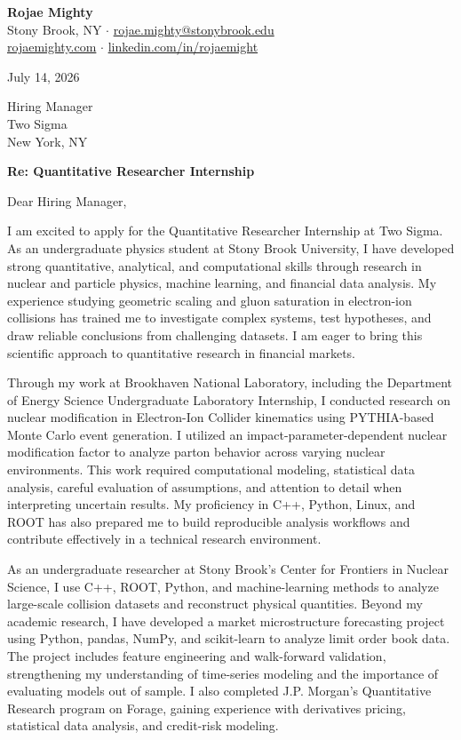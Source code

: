 \documentclass[10pt,letterpaper]{article}
\begin{document}
\textbf{Rojae Mighty}\\
Stony Brook, NY \quad$\cdot$\quad
\href{mailto:rojae.mighty@stonybrook.edu}{rojae.mighty@stonybrook.edu}\\
\href{https://rojaemighty.com}{rojaemighty.com} \quad$\cdot$\quad
\href{https://www.linkedin.com/in/rojaemight/}{linkedin.com/in/rojaemight}

\vspace{8pt}
July 14, 2026

\vspace{8pt}
Hiring Manager\\
Two Sigma\\
New York, NY

\vspace{8pt}
\textbf{Re: Quantitative Researcher Internship}

\vspace{4pt}
Dear Hiring Manager,

I am excited to apply for the Quantitative Researcher Internship at Two Sigma. As an undergraduate physics student at Stony Brook University, I have developed strong quantitative, analytical, and computational skills through research in nuclear and particle physics, machine learning, and financial data analysis. My experience studying geometric scaling and gluon saturation in electron-ion collisions has trained me to investigate complex systems, test hypotheses, and draw reliable conclusions from challenging datasets. I am eager to bring this scientific approach to quantitative research in financial markets.

Through my work at Brookhaven National Laboratory, including the Department of Energy Science Undergraduate Laboratory Internship, I conducted research on nuclear modification in Electron-Ion Collider kinematics using PYTHIA-based Monte Carlo event generation. I utilized an impact-parameter-dependent nuclear modification factor to analyze parton behavior across varying nuclear environments. This work required computational modeling, statistical data analysis, careful evaluation of assumptions, and attention to detail when interpreting uncertain results. My proficiency in C++, Python, Linux, and ROOT has also prepared me to build reproducible analysis workflows and contribute effectively in a technical research environment.

As an undergraduate researcher at Stony Brook's Center for Frontiers in Nuclear Science, I use C++, ROOT, Python, and machine-learning methods to analyze large-scale collision datasets and reconstruct physical quantities. Beyond my academic research, I have developed a market microstructure forecasting project using Python, pandas, NumPy, and scikit-learn to analyze limit order book data. The project includes feature engineering and walk-forward validation, strengthening my understanding of time-series modeling and the importance of evaluating models out of sample. I also completed J.P. Morgan's Quantitative Research program on Forage, gaining experience with derivatives pricing, statistical data analysis, and credit-risk modeling.
\end{document}
